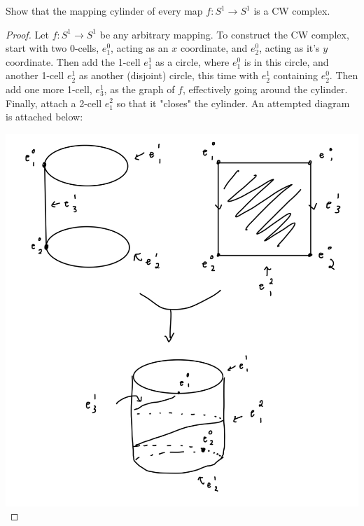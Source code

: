 \documentclass[12pt]{article}
\newenvironment{statement}[2][Statement]{\begin{trivlist}
\item[\hskip \labelsep {\bfseries #1}\hskip \labelsep {\bfseries #2.}]}{\end{trivlist}}
\begin{document}
\begin{statement}[Exercise]{0.17a}
    Show that the mapping cylinder of every map $f:S^1 \to S^1$ is a CW complex. 
\end{statement}
\begin{proof}
    Let $f:S^1 \to S^1$ be any arbitrary mapping. To construct the CW complex, start with two 0-cells, $e^0_1$, acting as an $x$ coordinate, and $e_2^0$, acting as it's $y$ coordinate. Then add the 1-cell $e^1_1$ as a circle, where $e^0_1$ is in this circle, and another 1-cell $e^1_2$ as another (disjoint) circle, this time with $e^1_2$ containing $e^0_2$. Then add one more 1-cell, $e^1_3$, as the graph of $f$, effectively going around the cylinder. Finally, attach a 2-cell $e^2_1$ so that it "closes" the cylinder. An attempted diagram is attached below:
    \par \includegraphics[scale=.3]{0.17a.jpg}
\end{proof}
\end{document}
